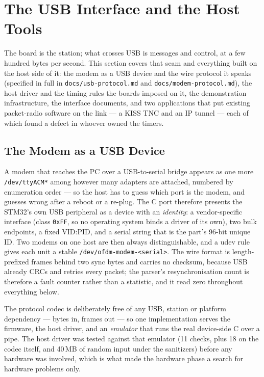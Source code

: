 \section{The USB Interface and the Host Tools}
\label{sec:host}

The board is the station; what crosses USB is messages and control, at
a few hundred bytes per second.  This section covers that seam and
everything built on the host side of it: the modem as a USB device and
the wire protocol it speaks (specified in full in
\texttt{docs/usb-protocol.md} and \texttt{docs/modem-protocol.md}), the
host driver and the timing rules the boards imposed on it, the
demonstration infrastructure, the interface documents, and two
applications that put existing packet-radio software on the link --- a
KISS TNC and an IP tunnel --- each of which found a defect in whoever
owned the timers.

\subsection{The Modem as a USB Device}
\label{sec:cport_usb}

A modem that reaches the PC over a USB-to-serial bridge appears as one
more \texttt{/dev/ttyACM*} among however many adapters are attached,
numbered by enumeration order --- so the host has to guess which port is
the modem, and guesses wrong after a reboot or a re-plug. The C port
therefore presents the STM32's own USB peripheral as a device with an
\emph{identity}: a vendor-specific interface (class \texttt{0xFF}, so no
operating system binds a driver of its own), two bulk endpoints, a fixed
VID:PID, and a serial string that is the part's 96-bit unique ID. Two
modems on one host are then always distinguishable, and a udev rule
gives each unit a stable \texttt{/dev/ofdm-modem-<serial>}. The wire
format is length-prefixed frames behind two sync bytes and carries no
checksum, because USB already CRCs and retries every packet; the
parser's resynchronisation count is therefore a fault counter rather
than a statistic, and it read zero throughout everything below.

The protocol codec is deliberately free of any USB, station or platform
dependency --- bytes in, frames out --- so one implementation serves the
firmware, the host driver, and an \emph{emulator} that runs the real
device-side C over a pipe. The host driver was tested against that
emulator (11 checks, plus 18 on the codec itself, and 40\,MB of random
input under the sanitizers) before any hardware was involved, which is
what made the hardware phase a search for hardware problems only.

